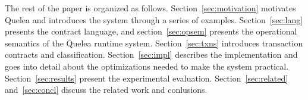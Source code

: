 The rest of the paper is organized as follows. Section~\ref{sec:motivation}
motivates Quelea and introduces the system through a series of examples.
Section~\ref{sec:lang} presents the contract language, and
section~\ref{sec:opsem} presents the operational semantics of the Quelea
runtime system. Section~\ref{sec:txns} introduces transaction contracts and
classification. Section~\ref{sec:impl} describes the implementation and goes
into detail about the optimizations needed to make the system practical.
Section~\ref{sec:results} present the experimental evaluation.
Section~\ref{sec:related} and~\ref{sec:concl} discuss the related work and
conlusions.
